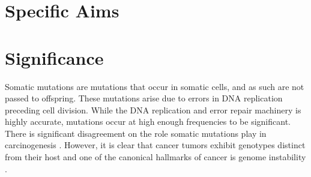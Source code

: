 




% 


\section{Specific Aims} %



\clearpage


\section{Significance}

Somatic mutations are mutations that occur in somatic cells, and as such are not passed to offspring.
These mutations arise due to errors in DNA replication preceding cell division.
While the DNA replication and error repair machinery is highly accurate, mutations occur at high enough frequencies to be significant.
There is significant disagreement on the role somatic mutations play in carcinogenesis \parencite{baker_cancer_2015}.
However, it is clear that cancer tumors exhibit genotypes distinct from their host and one of the canonical hallmarks of cancer is genome instability \parencite{hanahan_hallmarks_2000, hanahan_hallmarks_2011}.

